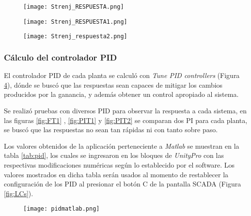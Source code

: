 {\begin{comment}
 dónde el motor no era esforzado a calentarse ni la bomba era sobreexigida

escalones ubicados en la parte central del rango útil estipulado .

 además obtener un control apropiado al sistema: algo no muy rapido ni muy lento
\end{comment}


\begin{figure}[h!]
	\centering
	\texttt{[image: Strenj\_RESPUESTA.png]}
	\label{fig:FT01}
\end{figure}
\begin{figure}[h!]
	\centering
	\texttt{[image: Strenj\_RESPUESTA1.png]}
	\label{fig:PIT01}
\end{figure}




\begin{figure}[h!]
	\centering
	\texttt{[image: Strenj\_respuesta2.png]}
	\label{fig:PIT02}
\end{figure}






\subsubsection{Cálculo del controlador PID}
El controlador PID de cada planta se calculó con \textit{Tune PID controllers} (Figura \ref{fig:PIDcontr}), dónde se buscó que las respuestas sean capaces de mitigar los cambios producidos por la ganancia, y además obtener un control apropiado al sistema. 

Se realizó pruebas con diversos PID para observar la respuesta a cada sistema, en las figuras \ref{fig:FT1} , \ref{fig:PIT1} y \ref{fig:PIT2} se comparan dos PI para cada planta, se buscó que las respuestas no sean tan rápidas ni con tanto sobre paso.

Los valores obtenidos de la aplicación perteneciente a \textit{Matlab} se muestran en la tabla \ref{tab:pid}, los cuales se ingresaron en los bloques de \textit{UnityPro} con las respectivas modificaciones numéricas según lo establecido por el software. Los valores mostrados en dicha tabla serán usados al momento de restablecer la configuración de los PID al presionar el botón C de la pantalla SCADA (Figura \ref{fig:LCs}).
\begin{figure}[h!]
	\centering
	\texttt{[image: pidmatlab.png]}
	\label{fig:PIDcontr}
\end{figure}

}
